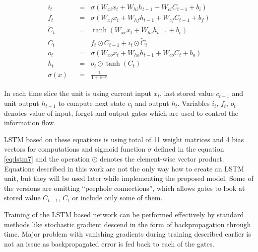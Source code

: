 \belowdisplayskip=24pt
\begin{align}
	i_t \hspace{7pt}&=\hspace{7pt} \sigma(W_{xi}x_t + W_{hi}h_{t-1} + W_{ci}C_{t-1} + b_i) \label{eq:lstm1}\\
	f_t \hspace{7pt}&=\hspace{7pt} \sigma(W_{xf}x_t + W_{hf}h_{t-1} + W_{cf}C_{t-1} + b_f) \label{eq:lstm2}\\
	\widetilde{C}_t\hspace{7pt}&=\hspace{7pt} \tanh(W_{xc}x_t + W_{hc}h_{t-1} + b_c) \label{eq:lstm3}\\
	C_t \hspace{7pt}&=\hspace{7pt} f_t\odot C_{t-1} + i_t\odot \widetilde{C}_t \label{eq:lstm4}\\
	o_t \hspace{7pt}&=\hspace{7pt} \sigma(W_{xo}x_t + W_{ho}h_{t-1} + W_{co}C_t + b_o) \label{eq:lstm5}\\
	h_t \hspace{7pt}&=\hspace{7pt} o_t\odot \tanh(C_t) \label{eq:lstm6}\\[16pt]
	\sigma(x) \hspace{7pt}&=\hspace{7pt} \frac{1}{1+e^{-x}} \label{eq:lstm7}
\end{align}

In each time slice the unit is using current input $ x_t $, last stored value $ c_{t-1} $ and unit output $ h_{t-1} $ to compute next state $ c_t $ and output $ h_t $. Variables $ i_t $, $ f_t $, $ o_t $ denotes value of input, forget and output gates which are used to control the information flow.

LSTM based on these equations is using total of 11 weight matrices and 4 bias vectors for computations and sigmoid function $ \sigma $ defined in the equation \eqref{eq:lstm7} and the operation $ \odot $ denotes the element-wise vector product. Equations described in this work are not the only way how to create an LSTM unit, but they will be used later while implementing the proposed model. Some of the versions are omitting \textquotedblleft peephole connections\textquotedblright, which allows gates to look at stored value $ C_{t-1} $, $ C_t $ or include only some of them.

Training of the LSTM based network can be performed effectively by standard methods like stochastic gradient descend in the form of backpropagation through time. Major problem with vanishing gradients during training described earlier is not an issue as backpropagated error is fed back to each of the gates.


